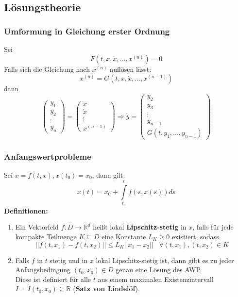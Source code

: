 \documentclass[a4paper,twocolumn,10pt]{article}
\begin{document}
\subsection{Lösungstheorie}

\subsubsection{Umformung in Gleichung erster Ordnung}
Sei
\begin{equation*}
F(t,x,\dot{x},...,x^{(n)})=0
\end{equation*}
Falls sich die Gleichung nach $x^{(n)}$ auflösen lässt:
\begin{equation*}
x^{(n)}=G(t,x,\dot{x},...,x^{(n-1)})
\end{equation*}
dann 
\begin{equation*}
\begin{pmatrix}y_1 \\ y_2 \\ \vdots \\ y_n\end{pmatrix}=\begin{pmatrix}x \\ \dot{x} \\ \vdots \\ x^{(n-1)}\end{pmatrix}\Rightarrow \dot{y}=\begin{pmatrix}y_2 \\ y_3 \\ \vdots \\ y_{n-1} \\ G(t,y_1,...,y_{n-1})\end{pmatrix}
\end{equation*}

\subsubsection{Anfangswertprobleme}
Sei $\dot{x}=f(t,x), x(t_0)=x_0$, dann gilt:
\begin{equation*}
x(t)=x_0+\int\limits_{t_0}^{t}f(s,x(s))ds
\end{equation*}
\textbf{Definitionen:}
\begin{enumerate}[label=$\bullet$]
\item Ein Vektorfeld $f:D\rightarrow\mathbb{R}^d$ heißt lokal \textbf{Lipschitz-stetig} in $x$, falls für jede kompakte Teilmenge $K\subseteq D$ eine Konstante $L_K\geq 0$ existiert, sodass
\begin{equation*}
||f(t,x_1)-f(t,x_2)||\leq L_K||x_1-x_2||\;\;\;\forall (t,x_1),(t,x_2)\in K
\end{equation*}
\item Falls $f$ in $t$ stetig und in $x$ lokal Lipschitz-stetig ist, dann gibt es zu jeder Anfangsbedingung $(t_0,x_0)\in D$ genau eine Lösung des AWP.\\
Diese ist definiert für alle $t$ aus einem maximalen Existenzintervall $I=I(t_0,x_0)\subseteq\mathbb{R}$ (\textbf{Satz von Lindelöf}).
\end{enumerate}
\end{document}
